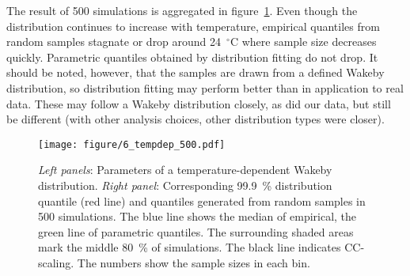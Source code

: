 \documentclass[a4paper]{article}
\begin{document}
\begin{multicols}{2}
The result of 500 simulations is aggregated in figure~\ref{fig:verif1}.
Even though the distribution continues to increase with temperature, empirical quantiles from random samples stagnate or drop around 24~$^\circ$C where sample size decreases quickly. 
Parametric quantiles obtained by distribution fitting do not drop.
It should be noted, however, that the samples are drawn from a defined Wakeby distribution, so distribution fitting may perform better than in application to real data.
These may follow a Wakeby distribution closely, as did our data, but still be different (with other analysis choices, other distribution types were closer).


\end{multicols}
\begin{figure}[H] %
\texttt{[image: figure/6\_tempdep\_500.pdf]}
\caption[Temperature dependent simulation]{\textit{Left panels}: Parameters of a temperature-dependent Wakeby distribution. \textit{Right panel}: Corresponding 99.9~\% distribution quantile (red line) and quantiles generated from random samples in 500 simulations. The blue line shows the median of empirical, the green line of parametric quantiles. The surrounding shaded areas mark the middle 80~\% of simulations. The black line indicates CC-scaling. The numbers show the sample sizes in each bin.}
\label{fig:verif1}
\end{figure}


\pagebreak
\end{document}
